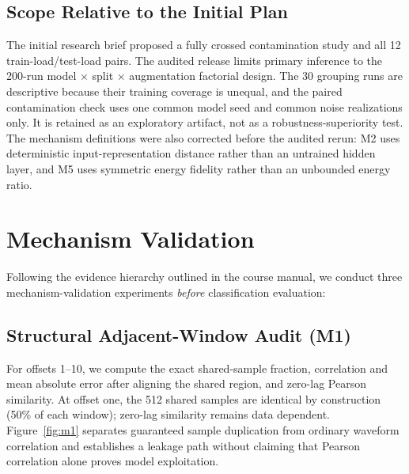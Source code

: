 ﻿\documentclass[11pt,a4paper]{article}
\begin{document}
\subsection{Scope Relative to the Initial Plan}

The initial research brief proposed a fully crossed contamination study and all 12 train-load/test-load pairs. The audited release limits primary inference to the 200-run model $\times$ split $\times$ augmentation factorial design. The 30 grouping runs are descriptive because their training coverage is unequal, and the paired contamination check uses one common model seed and common noise realizations only. It is retained as an exploratory artifact, not as a robustness-superiority test. The mechanism definitions were also corrected before the audited rerun: M2 uses deterministic input-representation distance rather than an untrained hidden layer, and M5 uses symmetric energy fidelity rather than an unbounded energy ratio.

\section{Mechanism Validation}
\label{sec:mechanism}

Following the evidence hierarchy outlined in the course manual, we conduct three mechanism-validation experiments \emph{before} classification evaluation:

\subsection{Structural Adjacent-Window Audit (M1)}

For offsets 1--10, we compute the exact shared-sample fraction, correlation and mean absolute error after aligning the shared region, and zero-lag Pearson similarity. At offset one, the 512 shared samples are identical by construction (50\% of each window); zero-lag similarity remains data dependent. Figure~\ref{fig:m1} separates guaranteed sample duplication from ordinary waveform correlation and establishes a leakage path without claiming that Pearson correlation alone proves model exploitation.
\end{document}
